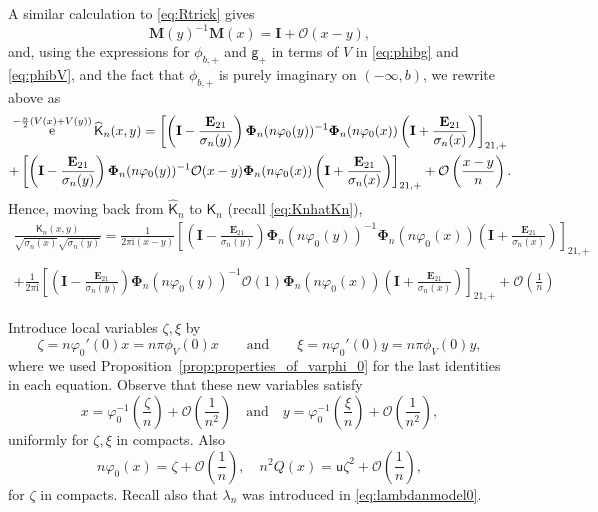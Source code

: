 \documentclass[reqno,a4paper,11pt]{amsart}
\DeclareMathOperator{\ee}{\rm e}
\newcommand{\Boh}{\mathcal{O}}
\newcommand{\ii}{\mathrm{i}}
\renewcommand{\bm}{\mathbf}
\newcommand{\msf}{\mathsf}
\newcommand{\wh}{\widehat}
\newcommand{\uad}{\msf u}
\theoremstyle{definition}
\theoremstyle{remark}
\numberwithin{equation}{section}
\begin{document}
    A similar calculation to \eqref{eq:Rtrick} gives 
    \[
        \bm M(y)^{-1} \bm M(x) = \bm I + \Boh(x-y),
    \]
    and, using the expressions for $\phi_{b,+}$ and $\msf g_+$ in terms of $V$ in \eqref{eq:phibg} and \eqref{eq:phibV}, and the fact that $\phi_{b,+}$ is purely imaginary on $(-\infty, b)$, we rewrite above as
%
\begin{multline*}
     \ee^{ -\frac{n}{2} \left( V(x)+V(y)\right)} \wh{\msf K}_n(x,y) 
        = \left[ \left( \bm I-\frac{\bm E_{21}}{\sigma_n(y)} \right) \bm \Phi_n(n \varphi_0(y))^{-1} \bm \Phi_n(n \varphi_0(x)) \left( \bm I+\frac{\bm E_{21}}{\sigma_n(x)}\right) \right]_{21,+} 
        \\
        + \left[ \left( \bm I-\frac{\bm E_{21}}{\sigma_n(y)} \right) \bm \Phi_n(n \varphi_0(y))^{-1}   
        \Boh(x-y) \bm \Phi_n(n \varphi_0(x)) \left( \bm I+\frac{\bm E_{21}}{\sigma_n(x)}\right) \right]_{21,+} 
     + \Boh\left(\frac{x-y}{n}\right) .
\end{multline*}
%
Hence, moving back from $\wh{\msf K}_n$ to $\msf K_n$ (recall \eqref{eq:KnhatKn}),
%
\begin{multline*}
     \frac{{\msf K}_n(x,y)}{\sqrt{\sigma_n(x)} \sqrt{\sigma_n(y)}} 
        = \frac{1}{ 2 \pi \ii (x-y) } \left[ \left( \bm I-\frac{\bm E_{21}}{\sigma_n(y)} \right) \bm \Phi_n(n \varphi_0(y))^{-1} \bm \Phi_n(n \varphi_0(x)) \left( \bm I+\frac{\bm E_{21}}{\sigma_n(x)}\right) \right]_{21,+} \\
      \\ + \frac{1}{ 2 \pi \ii  } \left[ \left( \bm I-\frac{\bm E_{21}}{\sigma_n(y)} \right) \bm \Phi_n(n \varphi_0(y))^{-1} \Boh(1) \bm \Phi_n(n \varphi_0(x)) \left( \bm I+\frac{\bm E_{21}}{\sigma_n(x)}\right) \right]_{21,+} + \Boh\left(\frac{1}{n}\right) 
\end{multline*}
  
    Introduce local variables $\zeta,\xi$ by
    $$
    \zeta= n\varphi_0'(0)x=n\pi\phi_V(0)x \qquad \text{and}\qquad  \xi = n\varphi_0'(0)y=n\pi\phi_V(0)y,
    $$
%
where we used Proposition~\ref{prop:properties_of_varphi_0} for the last identities in each equation.
%
Observe that these new variables satisfy
%
$$
x = \varphi_0^{-1}\left(\frac{\zeta}{n}\right)+\Boh\left(\frac{1}{n^2}\right)\quad \text{and}\quad y=\varphi_0^{-1}\left(\frac{\xi}{n}\right)+\Boh\left(\frac{1}{n^2}\right),
$$
%
uniformly for $\zeta,\xi$ in compacts. Also
\[
    n \varphi_0(x) = \zeta + \Boh\left( \frac{1}{n}\right), \quad
    n^2 Q(x) = \uad \zeta^2 + \Boh\left(
    \frac{1}{n} \right),
\]
for $\zeta$ in compacts. Recall also that $\lambda_n$ was introduced in \eqref{eq:lambdanmodel0}.
\end{document}

